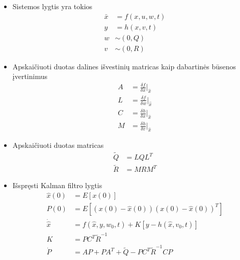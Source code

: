         \begin{itemize}
            \item Sistemos lygtis yra tokios
            \begin{equation}
                \begin{aligned}
                \bar{x} &= f(x, u, w, t) \\
                y &= h(x, v, t) \\
                w &\sim (0,Q) \\
                v &\sim (0, R)
                \end{aligned}
            \end{equation}
            \item Apskaičiuoti duotas dalines išvestinių matricas kaip dabartinės būsenos įvertinimus
            \begin{equation}
                \begin{aligned}
                    A &= \frac{\delta f}{\delta x}\Bigr|_{\hat{x}} \\
                    L &= \frac{\delta f}{\delta w}\Bigr|_{\hat{x}} \\
                    C &= \frac{\delta h}{\delta x}\Bigr|_{\hat{x}} \\
                    M &= \frac{\delta h}{\delta v}\Bigr|_{\hat{x}}
                \end{aligned}
            \end{equation}
            \item Apskaičiuoti duotas matricas
            \begin{equation}
                \label{eq:ekf_q_r}
                \begin{aligned}
                    \tilde{Q} &= LQL^T \\
                    \tilde{R} &= MRM^T
                \end{aligned}
            \end{equation}
            \item Išspręsti Kalman filtro lygtis
            \begin{equation}
                \label{eq:ekf}
                \begin{aligned}
                    \hat{x}(0) &= E[x(0)]  \\
                    P(0) &= E[ (x(0) - \hat{x}(0))(x(0) - \hat{x}(0))^T ] \\
                    \dot{\hat{x}} &= f(\hat{x}, y, w_0, t) + K[y - h(\hat{x}, v_0, t)] \\
                    K &= PC^T\tilde{R}^{-1} \\
                    \dot{P} &= AP + PA^T + \tilde{Q} - PC^T\tilde{R}^{-1}CP
                \end{aligned}
            \end{equation}
        \end{itemize}
        
